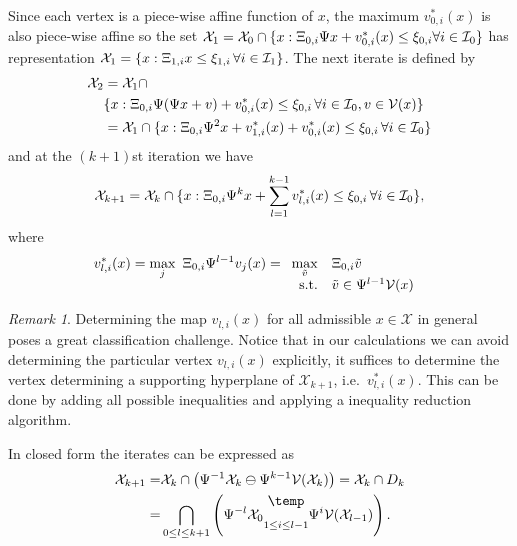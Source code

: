 \documentclass[journal]{IEEEtran}
\newcounter{thmcount}
\theoremstyle{remark}
\newtheorem{rem}[thmcount]{Remark}
\theoremstyle{definition}
\newcommand{\bigominus}{\raisebox{10pt}{$\temp$}}
\begin{document}
%
Since each vertex is a piece-wise affine function of $x$, the maximum $v_{0,i}^\ast(x)$ is also piece-wise affine
so the set $\mathcal X_1=\mathcal X_0 \cap \{x:\Xi_{0,i}\Psi x + v_{0,i}^\ast(x) \leq 
\xi_{0,i}\forall i\in\mathcal I_0\}$
has representation $\mathcal X_1 = \{x:\Xi_{1,i}x\leq\xi_{1,i}\,\forall i\in\mathcal I_1\}$.
%
The next iterate is defined by
%
\begin{align*}
  \mathcal X_2 &= \mathcal X_1 \cap \\ &\{x:\Xi_{0,i}\Psi(\Psi x + v) + v_{0,i}^\ast(x)\leq\xi_{0,i}\,
  \forall i\in\mathcal I_0,v\in\mathcal V(x)\}\\
  &= \mathcal X_1 \cap \{x: \Xi_{0,i}\Psi^2 x + v_{1,i}^\ast(x) + v_{0,i}^\ast(x)\leq\xi_{0,i}\,\forall 
  i\in\mathcal I_0\}
\end{align*}
%
and at the $(k+1)$st iteration we have
%
\[
  \mathcal X_{k+1} = \mathcal X_k\cap \{x:\Xi_{0,i}\Psi^k x + \sum_{l=1}^{k-1}v_{l,i}^\ast(x)
  \leq\xi_{0,i}\,\forall i\in\mathcal I_0\},
\]
%
where 
%
\[
  v_{l,i}^\ast(x)=\max_j \ \genmat_{0,i}\Psi^{l-1}v_j(x)
   = \begin{array}[t]{rl} \displaystyle\max_{\tilde v} & \genmat_{0,i}\tilde v\\ \text{s.t.}& \tilde v\in 
   \Psi^{l-1}\mathcal V(x) \end{array}
\]
%
\begin{rem}
Determining the map $v_{l,i}(x)$ for all admissible $x\in \mathcal X$ in general poses a great classification
challenge. 
%
Notice that in our calculations we can avoid determining the particular vertex $v_{l,i}(x)$ explicitly, it
suffices to determine the vertex determining a supporting hyperplane of $\mathcal X_{k+1}$, i.e.~$v_{l,i}^\ast(x)$. 
%
This can be done by adding all possible inequalities and applying a inequality reduction algorithm.
\end{rem}
%
In closed form the iterates can be expressed as
%
\begin{equation}\label{eq:set:iteration:state:dependent:constraints}
\begin{split}
  \mathcal X_{k+1} =& \mathcal X_k\cap\left(\Psi^{-1}\mathcal X_k \ominus \Psi^{k-1}\mathcal V(\mathcal X_k)\right)
  =\mathcal X_k\cap D_k \\
  =& \bigcap_{0\leq l\leq k+1}\left( \Psi^{-l} \mathcal X_0 \underset{1 \leq i\leq l-1}{\bigominus} 
  \Psi^i \mathcal V(\mathcal X_{l-1})\right).
\end{split}\end{equation}
\end{document}
